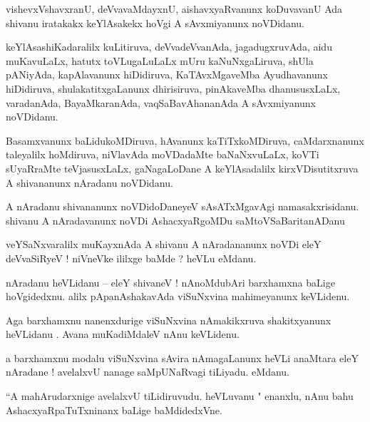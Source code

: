 \documentclass{article}
\begin{document}
\begin{mn}%
vishevxVshavxranU, deVvavaMdayxnU, aishavxyaRvanunx koDuvavanU Ada shivanu iratakakx keYlAsakekx 
hoVgi A sAvxmiyanunx noVDidanu.
\end{mn}

\begin{mn}%
keYlAsashiKadaralilx kuLitiruva, deVvadeVvanAda, jagadugxruvAda, aidu muKavuLaLx, hatutx 
toVLugaLuLaLx mUru kaNuNxgaLiruva, shUla pANiyAda, kapAlavanunx hiDidiruva, KaTAvxMgaveMba 
Ayudhavanunx hiDidiruva, shulakatitxgaLanunx dhirisiruva, pinAkaveMba dhanususxLaLx, varadanAda, 
BayaMkaranAda, vaqSaBavAhananAda A sAvxmiyanunx noVDidanu.
\end{mn}

\begin{mn}%
Basamxvanunx baLidukoMDiruva, hAvanunx kaTiTxkoMDiruva, caMdarxnanunx taleyalilx hoMdiruva, 
niVlavAda moVDadaMte baNaNxvuLaLx, koVTi sUyaRraMte teVjasusxLaLx, gaNagaLoDane A keYlAsadalilx 
kirxVDisutitxruva A shivananunx nAradanu noVDidanu.
\end{mn}

\begin{mn}%
A nAradanu shivananunx noVDidoDaneyeV sAsATxMgavAgi namasakxrisidanu. shivanu A nAradavanunx noVDi 
AshacxyaRgoMDu saMtoVSaBaritanADanu
\end{mn}

\begin{mn}%
veYSaNxvaralilx muKayxnAda A shivanu A nAradananunx noVDi eleY deVvaSiRyeV ! niVneVke ililxge baMde 
? heVLu eMdanu.
\end{mn}

\begin{mn}%
nAradanu heVLidanu -- eleY shivaneV ! nAnoMdubAri barxhamxna baLige hoVgidedxnu. alilx 
pApanAshakavAda viSuNxvina mahimeyanunx keVLidenu.
\end{mn}

\begin{mn}%
Aga barxhamxnu nanenxdurige viSuNxvina nAmakikxruva shakitxyanunx heVLidanu . Avana muKadiMdaleV 
nAnu keVLidenu.
\end{mn}

\begin{mn}%
a barxhamxnu modalu viSuNxvina sAvira nAmagaLanunx heVLi anaMtara eleY nAradane ! avelalxvU nanage 
saMpUNaRvagi tiLiyadu. eMdanu.
\end{mn}

\begin{mn}%
``A mahArudarxnige avelalxvU tiLidiruvudu. heVLuvanu " enanxlu, nAnu bahu AshacxyaRpaTuTxninanx 
baLige baMdidedxVne.
\end{mn}
\end{document}
